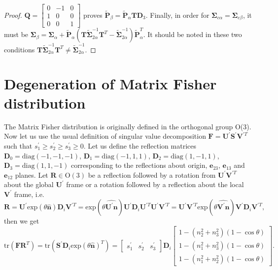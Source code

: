 \documentclass[12pt]{article}
\begin{document}
\begin{proof}
	$\mathbf{Q}=\begin{bmatrix}0&-1&0\\1&0&0\\0&0&1\end{bmatrix}$ proves $\tilde{\mathbf{P}}_\beta=\tilde{\mathbf{P}}_\alpha\mathbf{T}\mathbf{D}_3$.
	Finally, in order for $\mathbf{\Sigma}_{c\alpha}=\mathbf{\Sigma}_{c\beta}$, it must be  $\mathbf{\Sigma}_\beta=\mathbf{\Sigma}_\alpha+\tilde{\mathbf{P}}_\alpha\left(\mathbf{T}\tilde{\mathbf{\Sigma}}_{2\alpha}^{-1}\mathbf{T}^T-\tilde{\mathbf{\Sigma}}_{2\alpha}^{-1}\right)\tilde{\mathbf{P}}_\alpha^T$.
	It should be noted in these two conditions $\mathbf{T}\tilde{\mathbf{\Sigma}}_{2\alpha}^{-1}\mathbf{T}^T\neq\tilde{\mathbf{\Sigma}}_{2\alpha}^{-1}$.
\end{proof}

\section{Degeneration of Matrix Fisher distribution}
The Matrix Fisher distribution is originally defined in the orthogonal group O(3).
Now let us use the usual definition of singular value decomposition $\mathbf{F}=\mathbf{U}^\prime\mathbf{S}^\prime\mathbf{V}^{\prime T}$ such that $s^\prime_1 \geq s^\prime_2 \geq s^\prime_3 \geq 0$.
Let us define the reflection matrices $\mathbf{D}_0=\mathrm{diag}(-1,-1,-1)$, $\mathbf{D}_1=\mathrm{diag}(-1,1,1)$, $\mathbf{D}_2=\mathrm{diag}(1,-1,1)$, $\mathbf{D}_3=\mathrm{diag}(1,1,-1)$ corresponding to the reflections about origin, $\bm{e}_{23}$, $\bm{e}_{13}$ and $\bm{e}_{12}$ planes.
Let $\mathbf{R}\in\mathrm{O}(3)$ be a reflection followed by a rotation from $\mathbf{U}^\prime\mathbf{V}^{\prime T}$ about the global $\mathbf{U}^\prime$ frame or a rotation followed by a reflection about the local $\mathbf{V}^\prime$ frame, i.e.
\begin{equation}
	\mathbf{R} = \mathbf{U}^\prime\mathrm{exp}(\theta\hat{\bm{n}})\mathbf{D}_i\mathbf{V}^{\prime T} = \mathrm{exp}(\theta\widehat{\mathbf{U}^\prime\bm{n}})\mathbf{U}^\prime\mathbf{D}_i\mathbf{U}^{\prime T}\mathbf{U}^\prime\mathbf{V}^{\prime T} = \mathbf{U}^\prime\mathbf{V}^{\prime T}\mathrm{exp}(\theta\widehat{\mathbf{V}^\prime\bm{n}})\mathbf{V}^\prime\mathbf{D}_i\mathbf{V}^{\prime T},
\end{equation}
then we get
\begin{equation}
	\mathrm{tr}(\mathbf{F}\mathbf{R}^T) = \mathrm{tr}(\mathbf{S}^\prime\mathbf{D}_i\mathrm{exp}(\theta\hat{\bm{n}})^T) = \begin{bmatrix}s^\prime_1&s^\prime_2&s^\prime_3\end{bmatrix}\mathbf{D}_i\begin{bmatrix}1-(n_2^2+n_3^2)(1-\cos\theta)\\1-(n_1^2+n_3^2)(1-\cos\theta)\\1-(n_1^2+n_2^2)(1-\cos\theta)\end{bmatrix}.
\end{equation}
\end{document}
